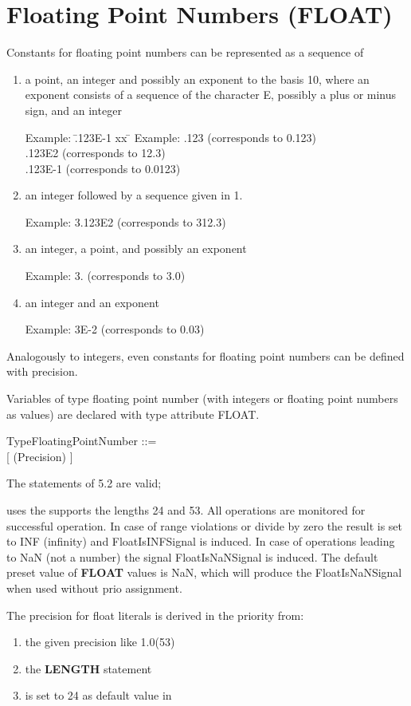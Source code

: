 \section{Floating Point Numbers (FLOAT)}  %

Constants for floating point numbers can be represented as a sequence of
\begin{enumerate}
\item a point, an integer and possibly an exponent to the basis 10,
where an exponent consists of a sequence of the character E, possibly a
plus or minus sign, and an integer

\begin{tabbing}
Example: \= .123E-1 xx \=  \kill
Example: \> .123 \> (corresponds to 0.123)\\
 \> .123E2 \> (corresponds to 12.3)\\
 \> .123E-1 \> (corresponds to 0.0123)
\end{tabbing}

\item an integer followed by a sequence given in 1.

Example: 3.123E2 (corresponds to 312.3)

\item an integer, a point, and possibly an exponent

Example: 3. (corresponds to 3.0)

\item an integer and an exponent

Example: 3E-2 (corresponds to 0.03)
\end{enumerate}

Analogously to integers, even constants for floating point numbers can
be defined with precision.

Variables of type floating point number (with integers or floating point
numbers as values) are declared with type attribute FLOAT.

TypeFloatingPointNumber ::=\\
 [ (Precision) ]

The statements of 5.2 are valid; 
\begin{added}
\OpenPEARL{} uses the supports the lengths 24 and 53.
All operations are monitored for successful operation.
In case of range violations or
divide by zero the result is set to INF (infinity) and
FloatIsINFSignal is induced.
In case of operations leading to NaN (not a number) the signal
FloatIsNaNSignal is induced.
The default preset value of {\bf FLOAT} values is NaN, which will produce
the FloatIsNaNSignal when used without prio assignment.

The precision for float literals is derived in the priority from: 
\begin{enumerate}
\item the given precision like 1.0(53)
\item the {\bf LENGTH} statement
\item is set to 24 as default value in \OpenPEARL
\end{enumerate}
\end{added}


